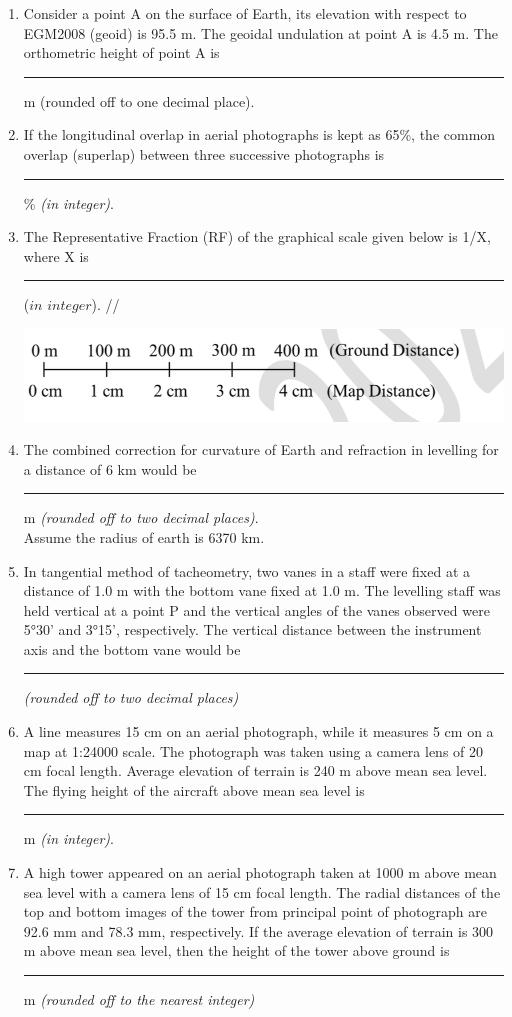 \documentclass[12pt]{article}
\begin{document}
\begin{enumerate}
\item  Consider a point A on the surface of Earth, its elevation with respect to EGM2008
(geoid) is 95.5 m. The geoidal undulation at point A is 4.5 m. The orthometric height
of point A is \rule{2cm}{0.15mm} m (rounded off to one decimal place).

\item If the longitudinal overlap in aerial photographs is kept as 65\%, the common overlap
(superlap) between three successive photographs is \rule{2cm}{0.15mm}\% \textit{(in integer)}. 

\item The Representative Fraction (RF) of the graphical scale given below is 1/X, where X is \rule{2cm}{0.15mm}($in$ $integer$). //

 \includegraphics[scale=0.6]{Figs/LatexImage7.png} 

\item The combined correction for curvature of Earth and refraction in levelling for a
distance of 6 km would be \rule{2cm}{0.15mm}m \textit{(rounded off to two decimal places)}.\\ 
   Assume the radius of earth is 6370 km.

\item In tangential method of tacheometry, two vanes in a staff were fixed at a distance
of 1.0 m with the bottom vane fixed at 1.0 m. The levelling staff was held vertical
at a point P and the vertical angles of the vanes observed were 5°30' and 3°15',
respectively. The vertical distance between the instrument axis and the bottom vane
would be \rule{2cm}{0.15mm} \textit{(rounded off to two decimal places)} 

\item A line measures 15 cm on an aerial photograph, while it measures 5 cm on a map
at 1:24000 scale. The photograph was taken using a camera lens of 20 cm focal
length. Average elevation of terrain is 240 m above mean sea level. The flying
height of the aircraft above mean sea level is\rule{2cm}{0.15mm} m \textit{(in integer)}.

\item A high tower appeared on an aerial photograph taken at 1000 m above mean sea
level with a camera lens of 15 cm focal length. The radial distances of the top and
bottom images of the tower from principal point of photograph are 92.6 mm and
78.3 mm, respectively. If the average elevation of terrain is 300 m above mean sea
level, then the height of the tower above ground is \rule{2cm}{0.15mm} m \textit{(rounded off to the nearest integer)}


\end{enumerate}
\end{document}
